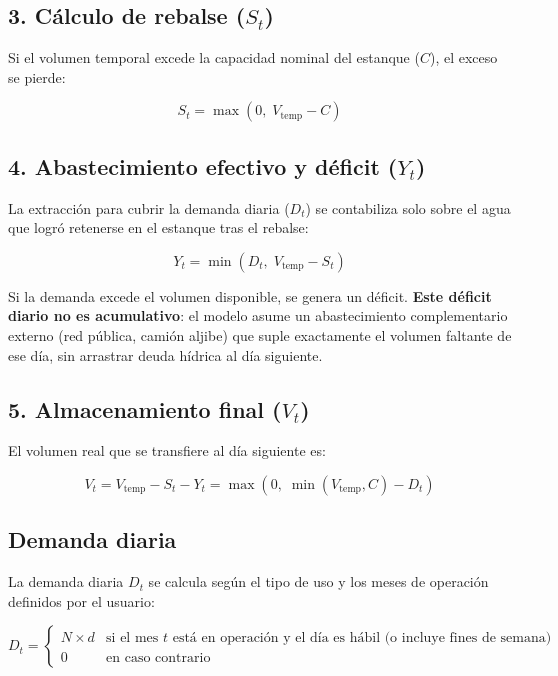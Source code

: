 \documentclass[12pt, a4paper]{article}
\begin{document}
\subsection{3. Cálculo de rebalse ($S_t$)}

Si el volumen temporal excede la capacidad nominal del estanque ($C$), el exceso se pierde:

\begin{equation}
    S_t = \max(0,\; V_{\text{temp}} - C)
\end{equation}

\subsection{4. Abastecimiento efectivo y déficit ($Y_t$)}

La extracción para cubrir la demanda diaria ($D_t$) se contabiliza solo sobre el agua que logró retenerse en el estanque tras el rebalse:

\begin{equation}
    Y_t = \min(D_t,\; V_{\text{temp}} - S_t)
\end{equation}

Si la demanda excede el volumen disponible, se genera un déficit. \textbf{Este déficit diario no es acumulativo}: el modelo asume un abastecimiento complementario externo (red pública, camión aljibe) que suple exactamente el volumen faltante de ese día, sin arrastrar deuda hídrica al día siguiente.

\subsection{5. Almacenamiento final ($V_t$)}

El volumen real que se transfiere al día siguiente es:

\begin{equation}
    V_t = V_{\text{temp}} - S_t - Y_t = \max\!\left(0,\; \min(V_{\text{temp}}, C) - D_t\right)
\end{equation}

\subsection{Demanda diaria}

La demanda diaria $D_t$ se calcula según el tipo de uso y los meses de operación definidos por el usuario:

\begin{equation}
    D_t =
    \begin{cases}
        N \times d & \text{si el mes } t \text{ está en operación y el día es hábil (o incluye fines de semana)} \\
        0 & \text{en caso contrario}
    \end{cases}
\end{equation}
\end{document}
